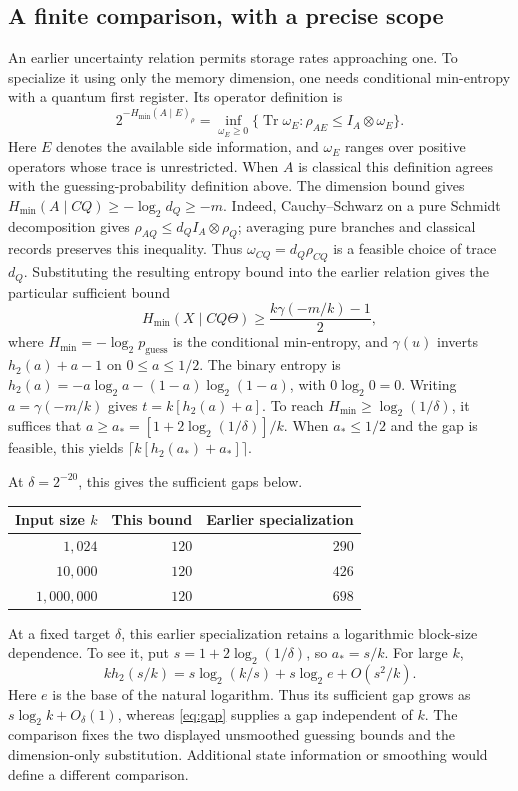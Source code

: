 \documentclass[11pt,a4paper]{article}
\newcommand{\Tr}{\operatorname{Tr}}
\newcommand{\pguess}{p_{\mathrm{guess}}}
\begin{document}
\subsection{A finite comparison, with a precise scope}
An earlier uncertainty relation permits storage rates approaching one. To specialize it using only the memory dimension, one needs conditional min-entropy with a quantum first register. Its operator definition is
\[
2^{-H_{\min}(A\mid E)_\rho}
=\inf_{\omega_E\geq0}\{\Tr\omega_E:
\rho_{AE}\leq I_A\otimes\omega_E\}.
\]
Here $E$ denotes the available side information, and $\omega_E$ ranges over positive operators whose trace is unrestricted. When $A$ is classical this definition agrees with the guessing-probability definition above. The dimension bound gives $H_{\min}(A\mid CQ)\geq-\log_2d_Q\geq-m$. Indeed, Cauchy--Schwarz on a pure Schmidt decomposition gives $\rho_{AQ}\leq d_Q I_A\otimes\rho_Q$; averaging pure branches and classical records preserves this inequality. Thus $\omega_{CQ}=d_Q\rho_{CQ}$ is a feasible choice of trace $d_Q$. Substituting the resulting entropy bound into the earlier relation gives the particular sufficient bound
\[
H_{\min}(X\mid CQ\Theta)\geq\frac{k\gamma(-m/k)-1}{2},
\]
where $H_{\min}=-\log_2\pguess$ is the conditional min-entropy, and $\gamma(u)$ inverts
$h_2(a)+a-1$ on $0\leq a\leq1/2$. The binary entropy is
$h_2(a)=-a\log_2a-(1-a)\log_2(1-a)$, with $0\log_2 0=0$.
Writing $a=\gamma(-m/k)$ gives $t=k[h_2(a)+a]$. To reach $H_{\min}\geq\log_2(1/\delta)$, it suffices that $a\geq a_*=[1+2\log_2(1/\delta)]/k$. When $a_*\leq1/2$ and the gap is feasible, this yields $\lceil k[h_2(a_*)+a_*]\rceil$.

At $\delta=2^{-20}$, this gives the sufficient gaps below.
\begin{center}\small
\begin{tabular}{@{}rrr@{}}\toprule
Input size $k$ & This bound & Earlier specialization\\\midrule
$1{,}024$ & $120$ & $290$\\
$10{,}000$ & $120$ & $426$\\
$1{,}000{,}000$ & $120$ & $698$\\\bottomrule
\end{tabular}\end{center}
At a fixed target $\delta$, this earlier specialization retains a logarithmic block-size dependence. To see it, put $s=1+2\log_2(1/\delta)$, so $a_*=s/k$. For large $k$,
\[
k h_2(s/k)
=s\log_2(k/s)+s\log_2 e+O(s^2/k).
\]
Here $e$ is the base of the natural logarithm. Thus its sufficient gap grows as $s\log_2k+O_\delta(1)$, whereas \eqref{eq:gap} supplies a gap independent of $k$. The comparison fixes the two displayed unsmoothed guessing bounds and the dimension-only substitution. Additional state information or smoothing would define a different comparison.
\end{document}
